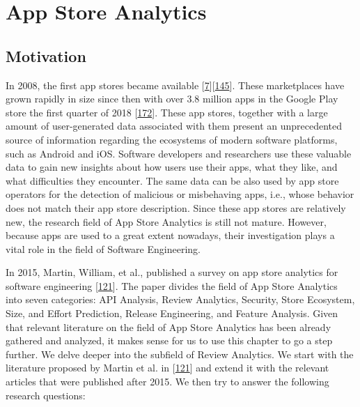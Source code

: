 \documentclass[]{book}
\begin{document}
\chapter{App Store Analytics}\label{app-store-analytics}

\section{Motivation}\label{motivation-6}

In 2008, the first app stores became available
{[}\protect\hyperlink{ref-appStoreLaunch}{7}{]}{[}\protect\hyperlink{ref-androidMarketLaunch}{145}{]}.
These marketplaces have grown rapidly in size since then with over 3.8
million apps in the Google Play store the first quarter of 2018
{[}\protect\hyperlink{ref-appNumber}{172}{]}. These app stores, together
with a large amount of user-generated data associated with them present
an unprecedented source of information regarding the ecosystems of
modern software platforms, such as Android and iOS. Software developers
and researchers use these valuable data to gain new insights about how
users use their apps, what they like, and what difficulties they
encounter. The same data can be also used by app store operators for the
detection of malicious or misbehaving apps, i.e., whose behavior does
not match their app store description. Since these app stores are
relatively new, the research field of App Store Analytics is still not
mature. However, because apps are used to a great extent nowadays, their
investigation plays a vital role in the field of Software Engineering.

In 2015, Martin, William, et al., published a survey on app store
analytics for software engineering
{[}\protect\hyperlink{ref-martin2015survey}{121}{]}. The paper divides
the field of App Store Analytics into seven categories: API Analysis,
Review Analytics, Security, Store Ecosystem, Size, and Effort
Prediction, Release Engineering, and Feature Analysis. Given that
relevant literature on the field of App Store Analytics has been already
gathered and analyzed, it makes sense for us to use this chapter to go a
step further. We delve deeper into the subfield of Review Analytics. We
start with the literature proposed by Martin et al. in
{[}\protect\hyperlink{ref-martin2015survey}{121}{]} and extend it with
the relevant articles that were published after 2015. We then try to
answer the following research questions:
\end{document}
